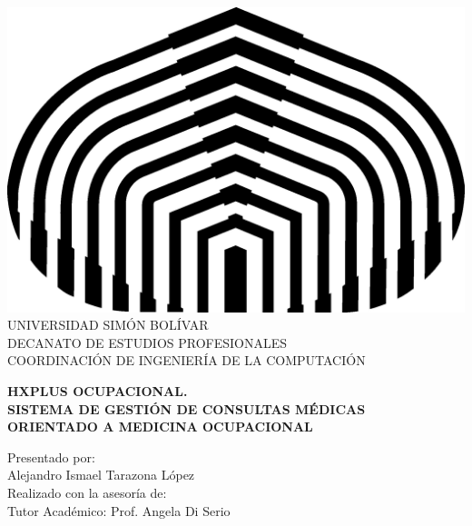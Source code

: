 \begin{titlepage}
    \begin{center}
        
        \includegraphics[scale=0.5]{figures/logo} \\
        
        \textsc {\large UNIVERSIDAD SIM\'ON BOL\'IVAR} \\
        \textsc{DECANATO DE ESTUDIOS PROFESIONALES\\
            COORDINACI\'ON DE INGENIER\'IA DE LA COMPUTACI\'ON}
        
        \bigskip
        \bigskip
        \bigskip
        \bigskip
        \bigskip
        \bigskip

        \textsc{\bfseries HXPLUS OCUPACIONAL.\\
            SISTEMA DE GESTIÓN DE CONSULTAS MÉDICAS\\
             ORIENTADO A MEDICINA OCUPACIONAL}
        
        \bigskip
        \bigskip
        \bigskip
        \bigskip
        \vfill
        
        \begin{minipage}{\textwidth}
            \centering
            Presentado por: \\
            Alejandro Ismael Tarazona López\\
            
            Realizado con la asesoría de:\\
            
            Tutor Académico: Prof. Angela Di Serio\\
            

\end{minipage}
\end{center}
\end{titlepage}
